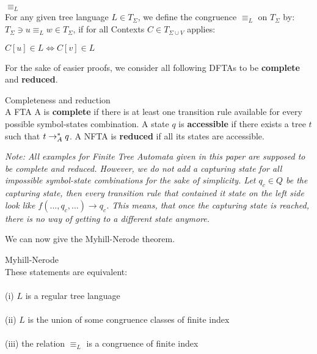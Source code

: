 \documentclass{llncs}
\begin{document}
\begin{definition}{\(\equiv_L\)} \cite{tata-nfta} \\
	For any given tree language \(L \in T_\Sigma\), we define the congruence \(\equiv_L\) on \(T_\Sigma\) by: \(T_\Sigma \ni u \equiv_L w \in T_\Sigma\), if for all Contexts \(C \in T_{\Sigma \cup V}\) applies:
	\begin{center}
		\(C[u] \in L \iff C[v] \in L\)
	\end{center}
\end{definition}

For the sake of easier proofs, we consider all following DFTAs to be \textbf{complete} and \textbf{reduced}.

\begin{definition}{Completeness and reduction} \cite{wiki-tree-automaton}\\
A FTA A is \textbf{complete} if there is at least one transition rule available for every possible symbol-states combination. A state \(q\) is \textbf{accessible} if there exists a tree \(t\) such that \(t \rightarrow_A^* q\). A NFTA is \textbf{reduced} if all its states are accessible.
\end{definition}

\textit{Note: All examples for Finite Tree Automata given in this paper are supposed to be complete and reduced. However, we do not add a capturing state for all impossible symbol-state combinations for the sake of simplicity. Let \(q_c \in Q\) be the capturing state, then every transition rule that contained it state on the left side look like \(f(..., q_c, ...) \rightarrow q_c\). This means, that once the capturing state is reached, there is no way of getting to a different state anymore.}

\pagebreak

We can now give the Myhill-Nerode theorem.

\begin{theorem}{Myhill-Nerode} \cite{tata-nfta}\\
	These statements are equivalent:\\\\
	(i) \(L\) is a regular tree language\\\\
	(ii) \(L\) is the union of some congruence classes of finite index\\\\
	(iii) the relation \(\equiv_L\) is a congruence of finite index
\end{theorem}
\end{document}
